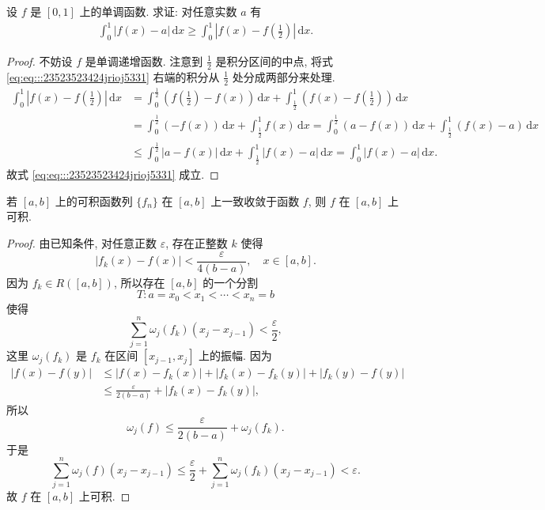 \documentclass[../../main.tex]{subfiles}%
\begin{document}
\begin{proposition}\label{proposition:单调函数减任意常数积分小于减其中点的积分}
设 $f$ 是 $[0,1]$ 上的单调函数. 求证: 对任意实数 $a$ 有
\begin{align}\label{eq:eq:::23523523424jrioj5331}
\int_{0}^{1}|f(x)-a|\,\mathrm{d}x\geqslant\int_{0}^{1}\left|f(x)-f\left(\frac{1}{2}\right)\right|\,\mathrm{d}x.
\end{align}
\end{proposition}
\begin{proof}

不妨设 $f$ 是单调递增函数. 注意到 $\frac{1}{2}$ 是积分区间的中点, 将式 \eqref{eq:eq:::23523523424jrioj5331} 右端的积分从 $\frac{1}{2}$ 处分成两部分来处理.
\begin{align*}
\int_{0}^{1}\left|f(x)-f\left(\frac{1}{2}\right)\right|\,\mathrm{d}x&=\int_{0}^{\frac{1}{2}}\left(f\left(\frac{1}{2}\right)-f(x)\right)\,\mathrm{d}x+\int_{\frac{1}{2}}^{1}\left(f(x)-f\left(\frac{1}{2}\right)\right)\,\mathrm{d}x\\
&=\int_{0}^{\frac{1}{2}}(-f(x))\,\mathrm{d}x+\int_{\frac{1}{2}}^{1}f(x)\,\mathrm{d}x
=\int_{0}^{\frac{1}{2}}(a-f(x))\,\mathrm{d}x+\int_{\frac{1}{2}}^{1}(f(x)-a)\,\mathrm{d}x\\
&\leqslant\int_{0}^{\frac{1}{2}}|a-f(x)|\,\mathrm{d}x+\int_{\frac{1}{2}}^{1}|f(x)-a|\,\mathrm{d}x
=\int_{0}^{1}|f(x)-a|\,\mathrm{d}x.
\end{align*}
故式 \eqref{eq:eq:::23523523424jrioj5331} 成立.

\end{proof}

\begin{example}
若 $[a,b]$ 上的可积函数列 $\{f_n\}$ 在 $[a,b]$ 上一致收敛于函数 $f$, 则 $f$ 在 $[a,b]$ 上可积.
\end{example}
\begin{proof}

由已知条件, 对任意正数 $\varepsilon$, 存在正整数 $k$ 使得
$$|f_k(x)-f(x)|<\frac{\varepsilon}{4(b-a)}, \quad x \in[a,b].$$
因为 $f_k \in R([a,b])$, 所以存在 $[a,b]$ 的一个分割
$$T: a=x_0<x_1<\cdots<x_n=b$$
使得
$$\sum_{j=1}^n \omega_j(f_k)(x_j-x_{j-1})<\frac{\varepsilon}{2},$$
这里 $\omega_j(f_k)$ 是 $f_k$ 在区间 $[x_{j-1},x_j]$ 上的振幅. 因为
$$
\begin{aligned}
|f(x)-f(y)| & \leqslant |f(x)-f_k(x)|+\left|f_k(x)-f_k(y)\right|+\left|f_k(y)-f(y)\right| \\
& \leqslant  \frac{\varepsilon}{2(b-a)}+\left|f_k(x)-f_k(y)\right|,
\end{aligned}
$$
所以
$$\omega_j(f) \leqslant  \frac{\varepsilon}{2(b-a)}+\omega_j(f_k).$$
于是
$$\sum_{j=1}^n \omega_j(f)\left(x_j-x_{j-1}\right) \leqslant  \frac{\varepsilon}{2}+\sum_{j=1}^n \omega_j\left(f_k\right)\left(x_j-x_{j-1}\right)<\varepsilon.$$
故 $f$ 在 $[a,b]$ 上可积.

\end{proof}
\end{document}
